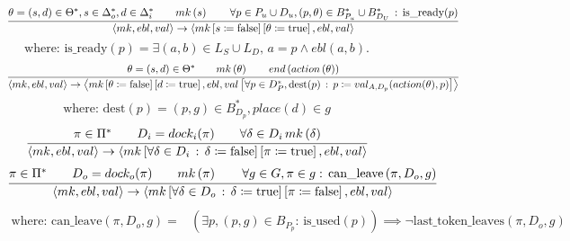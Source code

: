 {{}

\begin{figure}[tp]
%
\begin{equation}
\cfrac{\theta =\left(s,d\right) \in \Theta^*,s \in \Delta_o^*,d \in \Delta_i^*\qquad mk\left(s\right)\qquad\forall p \in P_{u}\cup D_{u},\left(p,\theta\right)\in B_{P_{u}}^{*}\cup B_{D_{U}}^{*}\,:\,\text{is\_ready}(p)}{\left\langle mk,ebl,val\right\rangle \rightarrow\left\langle mk\left[s\coloneqq\text{false}\right]\left[\theta\coloneqq\text{true}\right],ebl,val\right\rangle }
\label{eq:r1}
\end{equation}
%
\begin{equation*}
  \text{where: }\text{is\_ready}(p) = \exists\left(a,b\right)\in L_{S}\cup L_{D},\,a=p\land ebl\left(a,b\right).
\end{equation*}
%
\begin{equation}
\cfrac{\theta=\left(s,d\right) \in \Theta^*\qquad mk\left(\theta\right)\qquad end\left(action\left(\theta\right)\right)}{\left\langle mk,ebl,val\right\rangle \rightarrow\left\langle mk\left[\theta\coloneqq\text{false}\right]\left[d\coloneqq\text{true}\right],ebl,val\left[\forall p\in D_P^*,\text{dest}(p)\,:\, p\coloneqq val_{A,D_p}(action(\theta),p)\right]\right\rangle}
\label{eq:r2}
\end{equation}
%
\begin{equation*}
  \text{where: }\text{dest}(p) = \left(p,g\right)\in B_{D_{p}}^*,place(d)\in g
\end{equation*}
%
\begin{equation}
\cfrac{\pi\in\Pi^*\qquad D_i=dock_i(\pi)\qquad\forall\delta\in D_i\,mk\left(\delta\right)}{\left\langle mk,ebl,val\right\rangle \rightarrow\left\langle mk\left[\forall\delta\in D_i\,:\,\delta\coloneqq\text{false}\right]\left[\pi\coloneqq\text{true}\right],ebl,val\right\rangle }
\label{eq:r3}
\end{equation}
%
\begin{equation}
\cfrac{\pi\in\Pi^{*}\qquad D_o=dock_o(\pi)\qquad mk\left(\pi\right)\qquad \forall g\in G,\pi\in g:\,\text{can\_leave}\left(\pi,D_o,g\right)}{\left\langle mk,ebl,val\right\rangle \rightarrow\left\langle mk\left[\forall\delta\in D_o\,:\,\delta\coloneqq\text{true}\right]\left[\pi\coloneqq\text{false}\right],ebl,val\right\rangle }
\label{eq:r4}
\end{equation}
%
\begin{align*}
\text{where: }\text{can\_leave}\left(\pi,D_o,g\right) = & \left(\exists p,(p,g)\in B_{P_p}:\,\text{is\_used}(p)\right)\implies \lnot \text{last\_token\_leaves} \left(\pi,D_o,g\right) \\

\end{align*}
\end{figure}}
